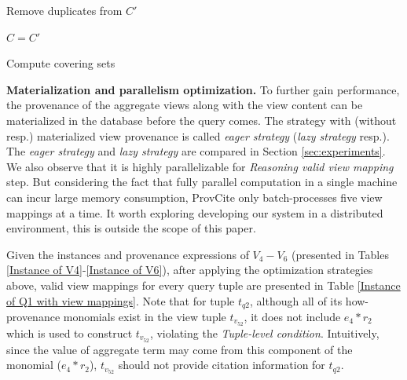 \begin{example}
\begin{algorithm}[h!]
{    
    
    Remove duplicates from $C'$
    
    $C = C'$
    
 }
 
 \caption{Compute covering sets}
 \label{compute_covering_sets}
 \end{algorithm}




\textbf{Materialization and parallelism optimization.} To further gain performance, the provenance of the aggregate views along with the view content can be materialized in the database before the query comes. The strategy with (without resp.) materialized view provenance is called {\em eager strategy} ({\em lazy strategy} resp.). The {\em eager strategy} and {\em lazy strategy} are compared in Section \ref{sec:experiments}.  We also observe that it is highly parallelizable for {\em Reasoning valid view mapping} step. But considering the fact that fully parallel computation in a single machine can incur large memory consumption, ProvCite only batch-processes five view mappings at a time. It worth exploring developing our system in a distributed environment, this is outside the scope of this paper.


Given the instances and provenance expressions of $V_4-V_6$ (presented in Tables \ref{Instance of V4}-\ref{Instance of V6}), after applying the optimization strategies above, valid view mappings for every query tuple are presented in Table \ref{Instance of Q1 with view mappings}. Note that for tuple $t_{q2}$, although all of its how-provenance monomials exist in the view tuple $t_{v_52}$, it does not include
$e_4*r_2$ which is used to construct $t_{v_52}$, violating the {\em Tuple-level condition}.  Intuitively, since the value of aggregate term may come from this component of the monomial ($e_4*r_2$), $t_{v_52}$ should not provide citation information for $t_{q2}$.



\end{example}
